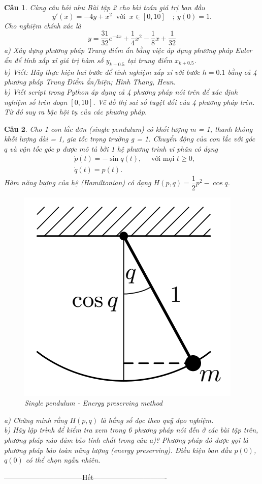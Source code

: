\documentclass[11pt]{article}
\newtheorem{bt}{Câu}
\begin{document}
\begin{bt}
Cùng câu hỏi như Bài tập 2 cho bài toán giá trị ban đầu
\begin{equation*}
y'(x) = - 4y + x^2  \ \mbox{ với } \ x \in [0,10] \quad ; \  y(0) = 1. 
\end{equation*}
%
Cho nghiệm chính xác là 
%
\[
y = \dfrac{31}{32} e^{-4x} + \dfrac{1}{4} x^2 - \dfrac{1}{8} x + \dfrac{1}{32}
\]
%
a) Xây dựng phương pháp Trung điểm ẩn bằng việc áp dụng phương pháp Euler ẩn để tính xấp xỉ giá trị hàm số $y_{k+0.5}$ tại trung điểm $x_{k+0.5}$. \\
b) Viết: Hãy thực hiện hai bước để tính nghiệm xấp xỉ với bước $h = 0.1$ bằng cả 4 phương pháp Trung Điểm ẩn/hiện; Hình Thang, Heun. \\
b) Viết script trong Python áp dụng cả 4 phương pháp nói trên để xác định nghiệm số trên đoạn $[0,10]$. Vẽ đồ thị sai số tuyệt đối của 4 phương pháp trên.
Từ đó suy ra bậc hội tụ của các phương pháp.
\end{bt}




\begin{bt} Cho 1 con lắc đơn (single pendulum) có khối lượng m = 1, thanh không khối lượng dài = 1, gia tốc trọng trường g = 1. 
Chuyển động của con lắc với góc $q$ và vận tốc góc $p$ được mô tả bởi 1 hệ phương trình vi phân có dạng 
\begin{align*}
	& \dot{p}(t) = - \sin q(t), \quad \mbox{ với mọi } t\geq 0, \\
	&  \dot{q}(t) = p(t).
\end{align*}
%
Hàm năng lượng của hệ (Hamiltonian) có dạng $H(p,q) = \dfrac{1}{2} p^2 - \cos q$.
%
\begin{figure}[!h]
	\centering
	\includegraphics[width=0.3\linewidth]{Figures/pendulum}
	\caption{Single pendulum - Energy preserving method}
	\label{fig:pendulum}
\end{figure}
%

\noindent a) Chứng minh rằng $H(p,q)$ là hằng số dọc theo quỹ đạo nghiệm. \\
b) Hãy lập trình để kiểm tra xem trong 6 phương pháp nói đến ở các bài tập trên, phương pháp nào đảm bảo tính chất trong câu a)? Phương pháp đó được gọi là phương pháp bảo toàn năng lượng (energy preserving). Điều kiện ban đầu $p(0)$, $q(0)$ có thể chọn ngẫu nhiên.
\end{bt}

\centerline{———————————Hết——————————-}
\end{document}
